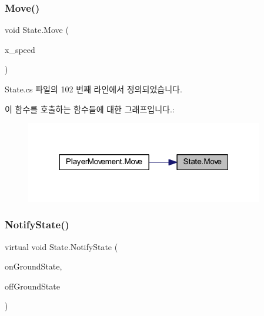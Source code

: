 \subsubsection{\texorpdfstring{Move()}{Move()}}
{\footnotesize\ttfamily void State.\+Move (\begin{DoxyParamCaption}\item[{float}]{x\+\_\+speed }\end{DoxyParamCaption})}



State.\+cs 파일의 102 번째 라인에서 정의되었습니다.


\begin{DoxyCode}{0}

\end{DoxyCode}
이 함수를 호출하는 함수들에 대한 그래프입니다.\+:
\nopagebreak
\begin{figure}[H]
\begin{center}
\leavevmode
\includegraphics[width=295pt]{d0/d8b/class_state_a4424d0f582fe05b9dc7cec2a0a7c735a_icgraph}
\end{center}
\end{figure}
\mbox{\label{class_state_a989a27f9b711812d983344ee381da419}} 
\subsubsection{\texorpdfstring{NotifyState()}{NotifyState()}}
{\footnotesize\ttfamily virtual void State.\+Notify\+State (\begin{DoxyParamCaption}\item[{\mbox{\hyperlink{class_state_ab9eb1c1d81f1903b8486d1275e78b68e}{On\+Ground}}}]{on\+Ground\+State,  }\item[{\mbox{\hyperlink{class_state_a7d945e793324c017a973205564cf1a56}{Off\+Ground}}}]{off\+Ground\+State }\end{DoxyParamCaption})\hspace{0.3cm}{\ttfamily [virtual]}}



